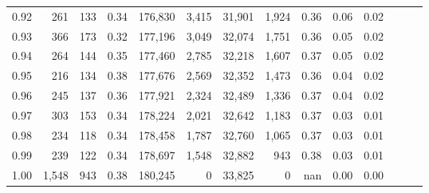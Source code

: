 \begin{tabular}{rrrrrrrrrrrrrr}
0.92 &    261 &  133 &  0.34 &  176,830 &    3,415 &  31,901 &   1,924 &  0.36 &  0.06 &      0.02 \\
0.93 &    366 &  173 &  0.32 &  177,196 &    3,049 &  32,074 &   1,751 &  0.36 &  0.05 &      0.02 \\
0.94 &    264 &  144 &  0.35 &  177,460 &    2,785 &  32,218 &   1,607 &  0.37 &  0.05 &      0.02 \\
0.95 &    216 &  134 &  0.38 &  177,676 &    2,569 &  32,352 &   1,473 &  0.36 &  0.04 &      0.02 \\
0.96 &    245 &  137 &  0.36 &  177,921 &    2,324 &  32,489 &   1,336 &  0.37 &  0.04 &      0.02 \\
0.97 &    303 &  153 &  0.34 &  178,224 &    2,021 &  32,642 &   1,183 &  0.37 &  0.03 &      0.01 \\
0.98 &    234 &  118 &  0.34 &  178,458 &    1,787 &  32,760 &   1,065 &  0.37 &  0.03 &      0.01 \\
0.99 &    239 &  122 &  0.34 &  178,697 &    1,548 &  32,882 &     943 &  0.38 &  0.03 &      0.01 \\
1.00 &  1,548 &  943 &  0.38 &  180,245 &        0 &  33,825 &       0 &   nan &  0.00 &      0.00 \\
\bottomrule
\end{tabular}
